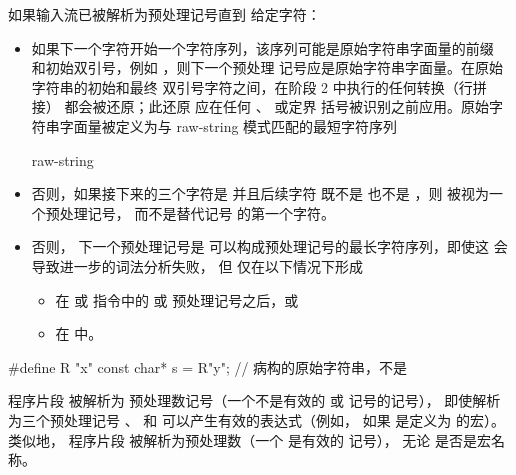 \pnum
如果输入流已被解析为预处理记号直到
给定字符：
\begin{itemize}
\item
{}%
如果下一个字符开始一个字符序列，该序列可能是原始字符串字面量的前缀
和初始双引号，例如 ，则下一个预处理
记号应是原始字符串字面量。在原始字符串的初始和最终
双引号字符之间，在阶段 2 中执行的任何转换（行拼接）
都会被还原；此还原
应在任何 、 或定界
括号被识别之前应用。原始字符串字面量被定义为与 raw-string 模式匹配的最短字符序列
\begin{ncbnf}
  raw-string
\end{ncbnf}

\item 否则，如果接下来的三个字符是 \tcode{<::} 并且后续字符
既不是 \tcode{:} 也不是 \tcode{>}，则 \tcode{<} 被视为一个预处理记号，
而不是替代记号 \tcode{<:} 的第一个字符。

\item 否则，
下一个预处理记号是
可以构成预处理记号的最长字符序列，即使这
会导致进一步的词法分析失败，
但  仅在以下情况下形成
\begin{itemize}
\item
在  或
 指令中的  或  预处理记号之后，或

\item
在  中。

\end{itemize}
\end{itemize}

\pnum
\begin{example}
\begin{codeblock}
#define R "x"
const char* s = R"y";           // 病构的原始字符串，不是 
\end{codeblock}
\end{example}

\pnum
\begin{example}
程序片段  被解析为
预处理数记号（一个不是有效的
 或  记号的记号），
即使解析为三个预处理记号
、\tcode{+} 和  可以产生有效的表达式（例如，
如果  是定义为  的宏）。类似地，
程序片段  被解析为预处理数（一个
是有效的  记号），
无论  是否是宏名称。
\end{example}

